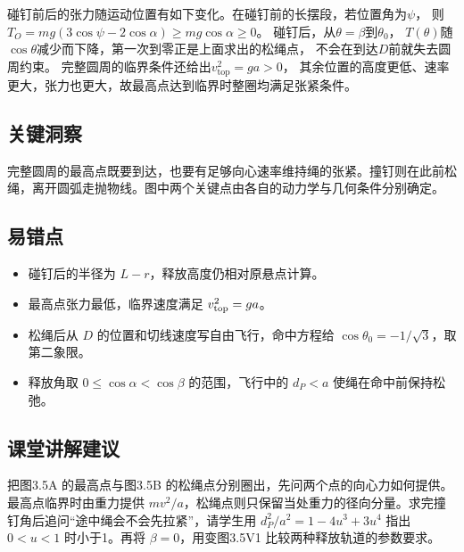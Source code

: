 \documentclass[UTF8,fontset=fandol,a4paper,11pt]{ctexart}
\begin{document}
碰钉前后的张力随运动位置有如下变化。在碰钉前的长摆段，若位置角为$\psi$，
则$T_O=mg(3\cos\psi-2\cos\alpha)\geq mg\cos\alpha\geq0$。
碰钉后，从$\theta=\beta$到$\theta_0$，
$T(\theta)$随$\cos\theta$减少而下降，第一次到零正是上面求出的松绳点，
不会在到达$D$前就失去圆周约束。
完整圆周的临界条件还给出$v_{\mathrm{top}}^2=ga>0$，
其余位置的高度更低、速率更大，张力也更大，故最高点达到临界时整圈均满足张紧条件。




\subsection*{关键洞察}

完整圆周的最高点既要到达，也要有足够向心速率维持绳的张紧。撞钉则在此前松绳，离开圆弧走抛物线。图中两个关键点由各自的动力学与几何条件分别确定。



\subsection*{易错点}

\begin{itemize}
\item 碰钉后的半径为 $L-r$，释放高度仍相对原悬点计算。
\item 最高点张力最低，临界速度满足 $v_{\rm top}^2=ga$。
\item 松绳后从 $D$ 的位置和切线速度写自由飞行，命中方程给 $\cos\theta_0=-1/\sqrt3$，取第二象限。
\item 释放角取 $0\leq\cos\alpha<\cos\beta$ 的范围，飞行中的 $d_P<a$ 使绳在命中前保持松弛。
\end{itemize}



\subsection*{课堂讲解建议}

把图3.5A 的最高点与图3.5B 的松绳点分别圈出，先问两个点的向心力如何提供。最高点临界时由重力提供 $mv^2/a$，松绳点则只保留当处重力的径向分量。求完撞钉角后追问“途中绳会不会先拉紧”，请学生用 $d_P^2/a^2=1-4u^3+3u^4$ 指出 $0<u<1$ 时小于1。再将 $\beta=0$，用变图3.5V1 比较两种释放轨道的参数要求。
\end{document}
